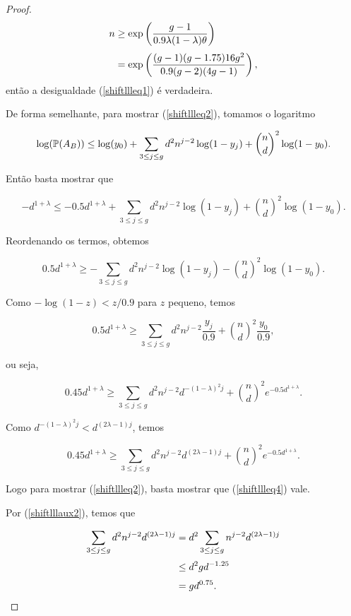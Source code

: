 \begin{proof}
\begin{equation*}
\setlength{\jot}{6pt}
\begin{aligned}
n &\geq \exp\left(\frac{g-1}{0.9\lambda(1-\lambda)\theta}\right)\\
&= \exp\left(\frac{(g-1)(g-1.75)16g^2}{0.9(g-2)(4g-1)}\right),
\end{aligned}
\end{equation*}
então a desigualdade (\ref{shiftllleq1}) é verdadeira.

De forma semelhante, para mostrar (\ref{shiftllleq2}), tomamos o logaritmo

\[\log(\mathbb{P}(A_B))\leq \log(y_0) + \sum\limits_{3\leq j \leq g}d^2n^{j-2}\log(1-y_j)+ \binom{n}{d}^2\log(1-y_0).\]

Então basta mostrar que

\[-d^{1+\lambda} \leq -0.5d^{1+\lambda} + \sum\limits_{3\leq j \leq g}d^2n^{j-2}\log(1-y_j)+ \binom{n}{d}^2\log(1-y_0).\]

Reordenando os termos, obtemos

\[0.5d^{1+\lambda} \geq - \sum\limits_{3\leq j \leq g}d^2n^{j-2}\log(1-y_j)- \binom{n}{d}^2\log(1-y_0).\]

Como $-\log(1-z) < z/0.9$ para $z$ pequeno, temos

\[0.5d^{1+\lambda} \geq \sum\limits_{3\leq j \leq g}d^2n^{j-2}\frac{y_j}{0.9} + \binom{n}{d}^2\frac{y_0}{0.9},\]

ou seja,


\[0.45d^{1+\lambda} \geq \sum\limits_{3\leq j \leq g}d^2n^{j-2}d^{-(1-\lambda)^2j} + \binom{n}{d}^2e^{-0.5d^{1+\lambda}}.\]

Como $d^{-(1-\lambda)^2j} < d^{(2\lambda-1)j}$, temos

\begin{equation}\label{shiftllleq4}
0.45d^{1+\lambda} \geq \sum\limits_{3\leq j \leq g}d^2n^{j-2}d^{(2\lambda-1)j} + \binom{n}{d}^2e^{-0.5d^{1+\lambda}}.
\end{equation}

Logo para mostrar (\ref{shiftllleq2}), basta mostrar que (\ref{shiftllleq4}) vale.

Por (\ref{shiftlllaux2}), temos que

\begin{equation*}
\setlength{\jot}{6pt}
\begin{aligned}
\sum\limits_{3\leq j \leq g}d^2n^{j-2}d^{(2\lambda-1)j} &= d^2\sum\limits_{3\leq j \leq g}n^{j-2}d^{(2\lambda-1)j} \\
&\leq d^2gd^{-1.25} \\
&= gd^{0.75}.
\end{aligned}
\end{equation*}


\end{proof}
